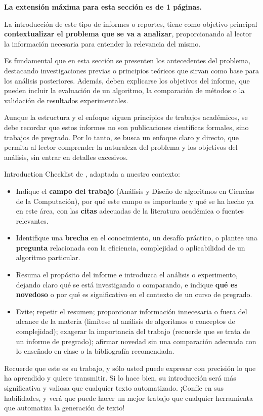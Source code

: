 \begin{mdframed}
    \textbf{La extensión máxima para esta sección es de 1 páginas.}
\end{mdframed}

La introducción de este tipo de informes o reportes, tiene como objetivo principal \textbf{contextualizar el problema que se va a analizar}, proporcionando al lector la información necesaria para entender la relevancia del mismo. 

Es fundamental que en esta sección se presenten los antecedentes del problema, destacando investigaciones previas o principios teóricos que sirvan como base para los análisis posteriores. Además, deben explicarse los objetivos del informe, que pueden incluir la evaluación de un algoritmo, la comparación de métodos o la validación de resultados experimentales.

Aunque la estructura y el enfoque siguen principios de trabajos académicos, se debe recordar que estos informes no son publicaciones científicas formales, sino trabajos de pregrado. Por lo tanto, se busca un enfoque claro y directo, que permita al lector comprender la naturaleza del problema y los objetivos del análisis, sin entrar en detalles excesivos. 


Introduction Checklist de  \cite{GoodScientificPaper}, adaptada a nuestro contexto:

\begin{itemize}
\item Indique el \textbf{campo del trabajo} (Análisis y Diseño de algoritmos en Ciencias de la Computación), por qué este campo es importante y qué se ha hecho ya en este área, con las \textbf{citas} adecuadas de la literatura académica o fuentes relevantes.
\item Identifique una \textbf{brecha} en el conocimiento, un desafío práctico, o plantee una \textbf{pregunta} relacionada con la eficiencia, complejidad o aplicabilidad de un algoritmo particular.
\item Resuma el propósito del informe e introduzca el análisis o experimento, dejando claro qué se está investigando o comparando, e indique \textbf{qué es novedoso} o por qué es significativo en el contexto de un curso de pregrado.
\item Evite; repetir el resumen; proporcionar información innecesaria o fuera del alcance de la materia (limítese al análisis de algoritmos o conceptos de complejidad); exagerar la importancia del trabajo (recuerde que se trata de un informe de pregrado); afirmar novedad sin una comparación adecuada con lo enseñado en clase o la bibliografía recomendada.
\end{itemize}



\begin{mdframed}
Recuerde que este es su trabajo, y sólo usted puede expresar con precisión lo que ha aprendido y quiere transmitir. Si lo hace bien, su introducción será más significativa y valiosa que cualquier texto automatizado. ¡Confíe en sus habilidades, y verá que puede hacer un mejor trabajo que cualquier herramienta que automatiza la generación de texto!
\end{mdframed}

